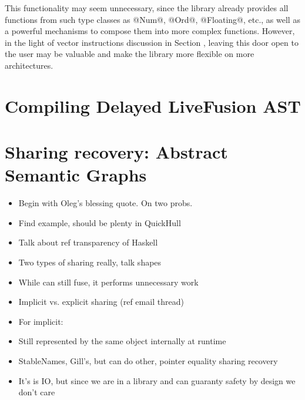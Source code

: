 \documentclass[preamble.tex]{subfiles}
\begin{document}
This functionality may seem unnecessary, since the library already provides all functions from such type classes as @Num@, @Ord@, @Floating@, etc., as well as a powerful mechanisms to compose them into more complex functions. However, in the light of vector instructions discussion in Section , leaving this door open to the user may be valuable and make the library more flexible on more architectures.



\clearpage

\section{Compiling Delayed LiveFusion AST}

\section{Sharing recovery: Abstract Semantic Graphs}

\begin{itemize}
\item Begin with Oleg's blessing quote. On two probs.
\item Find example, should be plenty in QuickHull
\item Talk about ref transparency of Haskell
\item Two types of sharing really, talk shapes
\item While can still fuse, it performs unnecessary work
\item Implicit vs. explicit sharing (ref email thread)
\item For implicit:
\item Still represented by the same object internally at runtime
\item StableNames, Gill's, but can do other, pointer equality sharing recovery
\item It's is IO, but since we are in a library and can guaranty safety by design we don't care
\end{itemize}


\IfNotCompilingAll{}
\end{document}
